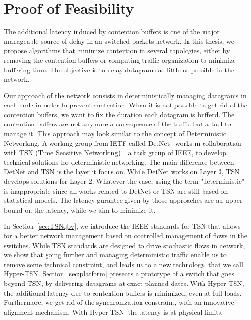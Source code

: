 
\chapter{Proof of Feasibility}
\label{chap:TSN}
\minitoc

The additional latency induced by contention buffers is one of the major manageable source of delay in an switched packets network.
In this thesis, we propose algorithms that minimize contention in several topologies, either by removing the contention buffers or computing traffic organization to minimize buffering time. The objective is to delay datagrams as little as possible in the network.

Our approach of the network consists in deterministically managing datagrams in each node in order to prevent contention. When it is not possible to get rid of the contention buffers, we want to fix the duration each datagram is bufferd. The contention buffers are not anymore a consequence of the traffic but a tool to manage it. This approach may look similar to the concept of Deterministic Networking. A working group from IETF called DetNet~\cite{finn-detnet-architecture-08} works in collaboration with TSN (Time Sensitive Networking)~\cite{ieee802}, a task group of IEEE, to develop technical solutions for deterministic networking. The main difference between DetNet and TSN is the layer it focus on. While DetNet works on Layer 3, TSN develops solutions for Layer 2. Whatever the case, using the term "deterministic" is inappropriate since all works related to DetNet or TSN are still based on statistical models. The latency gurantee given by those approaches are an upper bound on the latency, while we aim to minimize it.

In Section~\ref{sec:TSNqbv}, we introduce the IEEE standards for TSN that allows for a better network management based on  controlled management of flows in the switches. While TSN standards are designed to drive stochastic flows in network, we show that going further and managing deterministic traffic enable us to remove some technical constraint, and leads us to a new technology, that we call Hyper-TSN. Section~\ref{sec:platform} presents a prototype of a switch that goes beyond TSN, by delivering datagrams at exact planned dates. With Hyper-TSN, the additional latency due to contention buffers is minimized, even at full loads. Furthermore, we get rid of the synchronization constraint, with an innovative alignment mechanism. With Hyper-TSN, the latency is at physical limits.
\cite{metricsietf}


